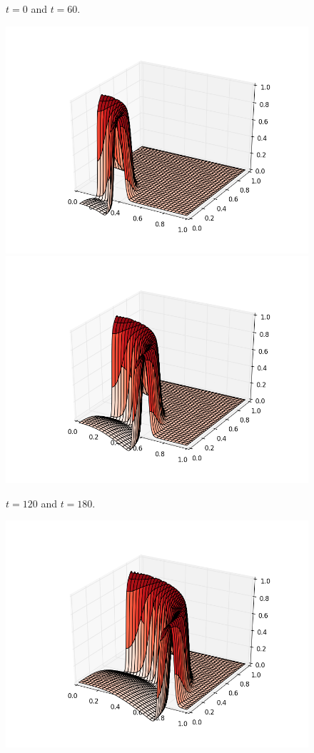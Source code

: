 \documentclass[12pt]{article}
\begin{document}
\begin{enumerate}[(a)]
\begin{figure}[H]
\caption{$t=0$ and $t=60$.}
\end{figure}
\begin{figure}[H]
\includegraphics[scale=0.4]{partb_fig_frames/partb_fig05.png}%
\includegraphics[scale=0.4]{partb_fig_frames/partb_fig07.png}
\caption{$t=120$ and $t=180$.}
\end{figure}
\begin{figure}[H]
\includegraphics[scale=0.4]{partb_fig_frames/partb_fig09.png}%

\end{figure}
\end{enumerate}
\end{document}
